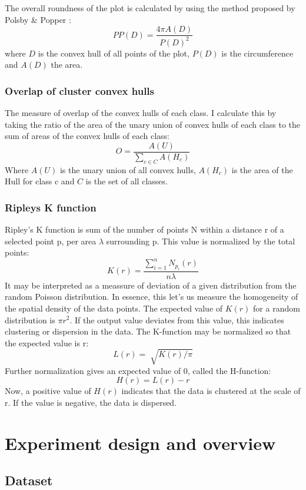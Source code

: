 \documentclass[11pt]{article}
\begin{document}
The overall roundness of the plot is calculated by using the method proposed by Polsby \& Popper \cite{popper}:
\[PP(D) = \frac{4 \pi A(D)}{P(D)^{2}} \]
where \(D\) is the convex hull of all points of the plot, \(P(D)\) is the circumference and \(A(D)\) the area.
\subsubsection{Overlap of cluster convex hulls}
\label{sec:org274a5d2}

The measure of overlap of the convex hulls of each class. I calculate this by taking the ratio of the area of the unary union of convex hulls of each class to the sum of areas of the convex hulls of each class:
\[ O = \frac{A(U)}{\sum_{c \in C}A(H_{c})} \]
Where \(A(U)\) is the unary union of all convex hulls, \(A(H_{c})\) is the area of the Hull for class c and \(C\) is the set of all classes.
\subsubsection{Ripleys K function}
\label{sec:org533d625}

Ripley's K function is sum of the number of points N within a distance r of a selected point p, per area \(\lambda\) surrounding p. This  value is normalized by the total points:
\[K(r) = \frac{\sum_{i=1}^{n}N_{p_{i}}(r)}{n \lambda}\]
It may be interpreted as a meassure of deviation of a given distribution from the random Poisson distribution. In essence, this let's us measure the homogeneity of the spatial density of the data points. The expected value of \(K(r)\) for a random distribution is \(\pi r^{2}\). If the output value deviates from this value, this indicates clustering or dispersion in the data. The K-function may be normalized so that the expected value is r:
\[L(r) = \sqrt[]{K(r)/\pi}\]
Further normalization gives an expected value of 0, called the H-function:
\[H(r) = L(r) - r\]
Now, a positive value of \(H(r)\) indicates that the data is clustered at the scale of r. If the value is negative, the data is dispersed.

\section{Experiment design and overview}
\label{sec:orga220b5b}
\subsection{Dataset}
\label{sec:orgac308b8}
\end{document}

